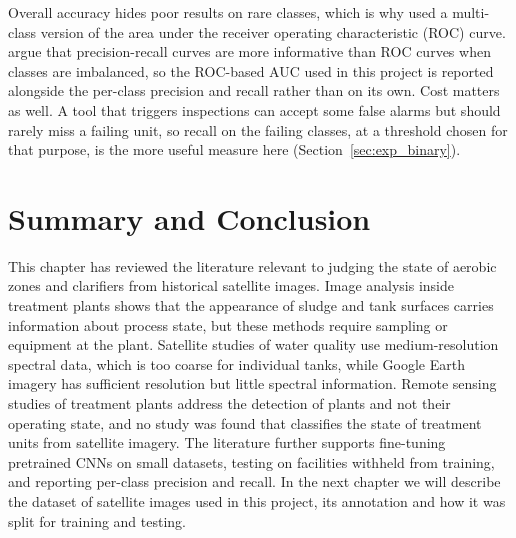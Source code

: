 Overall accuracy hides poor results on rare classes, which is why \citet{buda2018} used a multi-class version of the area under the receiver operating characteristic (ROC) curve. \citet{saito2015} argue that precision-recall curves are more informative than ROC curves when classes are imbalanced, so the ROC-based AUC used in this project is reported alongside the per-class precision and recall rather than on its own. Cost matters as well. A tool that triggers inspections can accept some false alarms but should rarely miss a failing unit, so recall on the failing classes, at a threshold chosen for that purpose, is the more useful measure here (Section~\ref{sec:exp_binary}).

\section{Summary and Conclusion}

This chapter has reviewed the literature relevant to judging the state of aerobic zones and clarifiers from historical satellite images. Image analysis inside treatment plants shows that the appearance of sludge and tank surfaces carries information about process state, but these methods require sampling or equipment at the plant. Satellite studies of water quality use medium-resolution spectral data, which is too coarse for individual tanks, while Google Earth imagery has sufficient resolution but little spectral information. Remote sensing studies of treatment plants address the detection of plants and not their operating state, and no study was found that classifies the state of treatment units from satellite imagery. The literature further supports fine-tuning pretrained CNNs on small datasets, testing on facilities withheld from training, and reporting per-class precision and recall. In the next chapter we will describe the dataset of satellite images used in this project, its annotation and how it was split for training and testing.
